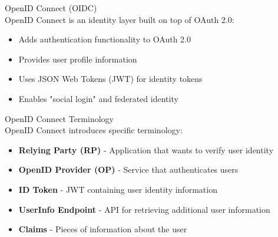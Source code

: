 \begin{definition}{OpenID Connect (OIDC)}\\
OpenID Connect is an identity layer built on top of OAuth 2.0:
\begin{itemize}
    \item Adds authentication functionality to OAuth 2.0
    \item Provides user profile information
    \item Uses JSON Web Tokens (JWT) for identity tokens
    \item Enables "social login" and federated identity
\end{itemize}
\end{definition}

\begin{concept}{OpenID Connect Terminology}\\
OpenID Connect introduces specific terminology:
\begin{itemize}
    \item \textbf{Relying Party (RP)} - Application that wants to verify user identity
    \item \textbf{OpenID Provider (OP)} - Service that authenticates users
    \item \textbf{ID Token} - JWT containing user identity information
    \item \textbf{UserInfo Endpoint} - API for retrieving additional user information
    \item \textbf{Claims} - Pieces of information about the user
\end{itemize}
\end{concept}

